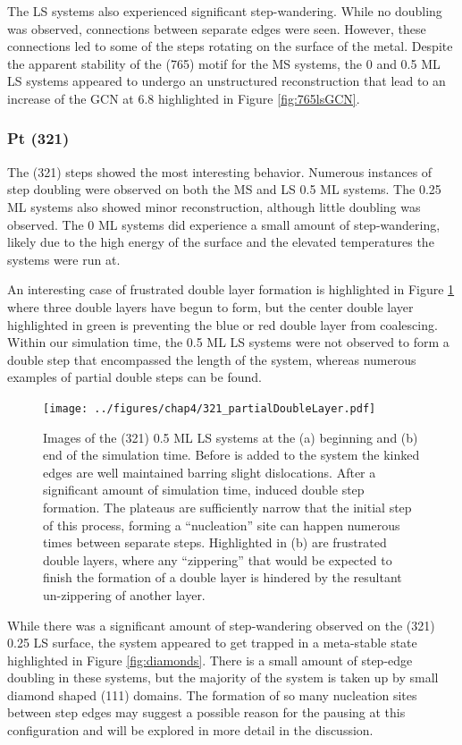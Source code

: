 The LS systems also experienced significant step-wandering. While no doubling
was observed, connections between separate edges were seen. However, these
connections led to some of the steps rotating on the surface of the metal.
Despite the apparent stability of the (765) motif for the MS systems, the 0 and
0.5 ML LS systems appeared to undergo an unstructured reconstruction that lead
to an increase of the GCN at 6.8 highlighted in Figure \ref{fig:765lsGCN}.

\subsubsection{Pt (321)}
The (321) steps showed the most interesting behavior. Numerous instances of
step doubling were observed on both the MS and LS 0.5 ML systems. The 0.25 ML
systems also showed minor reconstruction, although little doubling
was observed. The 0 ML systems did experience a small amount of step-wandering,
likely due to the high energy of the surface and the elevated temperatures the
systems were run at.

An interesting case of frustrated double layer formation is highlighted in
Figure \ref{fig:partialDoubleLayer} where three double layers have begun to
form, but the center double layer highlighted in green is preventing the blue
or red double layer from coalescing. Within our simulation time, the 0.5 ML
LS systems were not observed to form a double step that encompassed the length
of the system, whereas numerous examples of partial double steps can be found.

\begin{figure}
\centering
\texttt{[image: ../figures/chap4/321\_partialDoubleLayer.pdf]}
\caption{Images of the (321) 0.5 ML LS systems at the (a) beginning and
(b) end of the simulation time. Before  is added to the system the
kinked edges are well maintained barring slight dislocations. After a
significant amount of simulation time,  induced double step formation.
The plateaus are sufficiently narrow that the initial step of this process, forming a
``nucleation'' site can happen numerous times between separate steps.
Highlighted in (b) are frustrated double layers, where any ``zippering'' that
would be expected to finish the formation of a double layer is hindered by the
resultant un-zippering of another layer.}
\label{fig:partialDoubleLayer}
\end{figure}

While there was a significant amount of step-wandering observed on the (321)
0.25 LS surface, the system appeared to get trapped in a meta-stable state
highlighted in Figure \ref{fig:diamonds}. There is a small amount of step-edge
doubling in these systems, but the majority of the system is taken up by small
diamond shaped (111) domains. The formation of so many nucleation sites between
step edges may suggest a possible reason for the pausing at this configuration
and will be explored in more detail in the discussion.

